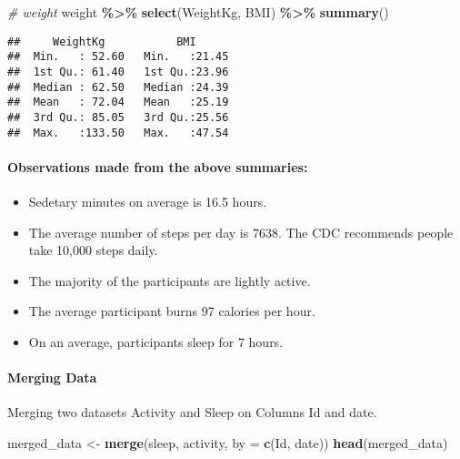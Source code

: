 \documentclass[
]{article}
\newenvironment{Shaded}{\begin{snugshade}}{\end{snugshade}}
\newcommand{\AttributeTok}[1]{\textcolor[rgb]{0.13,0.29,0.53}{#1}}
\newcommand{\CommentTok}[1]{\textcolor[rgb]{0.56,0.35,0.01}{\textit{#1}}}
\newcommand{\FunctionTok}[1]{\textcolor[rgb]{0.13,0.29,0.53}{\textbf{#1}}}
\newcommand{\NormalTok}[1]{#1}
\newcommand{\OtherTok}[1]{\textcolor[rgb]{0.56,0.35,0.01}{#1}}
\newcommand{\SpecialCharTok}[1]{\textcolor[rgb]{0.81,0.36,0.00}{\textbf{#1}}}
\newcommand{\StringTok}[1]{\textcolor[rgb]{0.31,0.60,0.02}{#1}}
\providecommand{\tightlist}{%
  \setlength{\itemsep}{0pt}\setlength{\parskip}{0pt}}
\begin{document}
\begin{Shaded}
\begin{Highlighting}[]
\CommentTok{\# weight}
\NormalTok{weight }\SpecialCharTok{\%\textgreater{}\%}
  \FunctionTok{select}\NormalTok{(WeightKg, BMI) }\SpecialCharTok{\%\textgreater{}\%}
  \FunctionTok{summary}\NormalTok{()}
\end{Highlighting}
\end{Shaded}

\begin{verbatim}
##     WeightKg           BMI       
##  Min.   : 52.60   Min.   :21.45  
##  1st Qu.: 61.40   1st Qu.:23.96  
##  Median : 62.50   Median :24.39  
##  Mean   : 72.04   Mean   :25.19  
##  3rd Qu.: 85.05   3rd Qu.:25.56  
##  Max.   :133.50   Max.   :47.54
\end{verbatim}

\hypertarget{observations-made-from-the-above-summaries}{%
\paragraph{Observations made from the above
summaries:}\label{observations-made-from-the-above-summaries}}

\begin{itemize}
\tightlist
\item
  Sedetary minutes on average is 16.5 hours.
\item
  The average number of steps per day is 7638. The CDC recommends people
  take 10,000 steps daily.
\item
  The majority of the participants are lightly active.
\item
  The average participant burns 97 calories per hour.
\item
  On an average, participants sleep for 7 hours.
\end{itemize}

\hypertarget{merging-data}{%
\paragraph{Merging Data}\label{merging-data}}

Merging two datasets Activity and Sleep on Columns Id and date.

\begin{Shaded}
\begin{Highlighting}[]
\NormalTok{merged\_data }\OtherTok{\textless{}{-}} \FunctionTok{merge}\NormalTok{(sleep, activity, }\AttributeTok{by =} \FunctionTok{c}\NormalTok{(}\StringTok{\textquotesingle{}Id\textquotesingle{}}\NormalTok{, }\StringTok{\textquotesingle{}date\textquotesingle{}}\NormalTok{))}
\FunctionTok{head}\NormalTok{(merged\_data) }
\end{Highlighting}
\end{Shaded}
\end{document}
